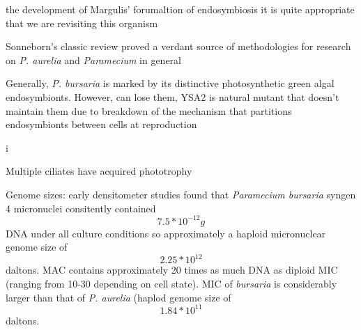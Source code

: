 the development of Margulis' forumaltion of endosymbiosis \citep{Margulis1998} it is
quite appropriate that we are revisiting this organism

Sonneborn's classic review \citep{Sonneborn1950} proved a verdant source of methodologies
for research on  \textit{P. aurelia} and \textit{Paramecium} in general



Generally, \textit{P. bursaria} is marked by its distinctive photosynthetic green algal endosymbionts.
However, can lose them, YSA2 is natural mutant that doesn't maintain them due to breakdown of the mechanism
that partitions endosymbionts between cells at reproduction \citep{Tonooka2002} %








i

Multiple ciliates have acquired phototrophy \citep{Johnson2011}



Genome sizes: early densitometer studies found that \textit{Paramecium bursaria} syngen 4 
micronuclei consitently contained \[ 7.5*10^{-12}g \] DNA under all culture conditions so 
approximately a haploid micronuclear genome size of \[ 2.25*10^{12}\] daltons.
MAC contains approximately 20 times as much DNA as diploid MIC (ranging from 10-30
depending on cell state).
MIC of \textit{bursaria} is considerably larger than that of \textit{P. aurelia}
(haplod genome size of \[ 1.84*10^{11} \] daltons.
\citep{Cullis1972}

